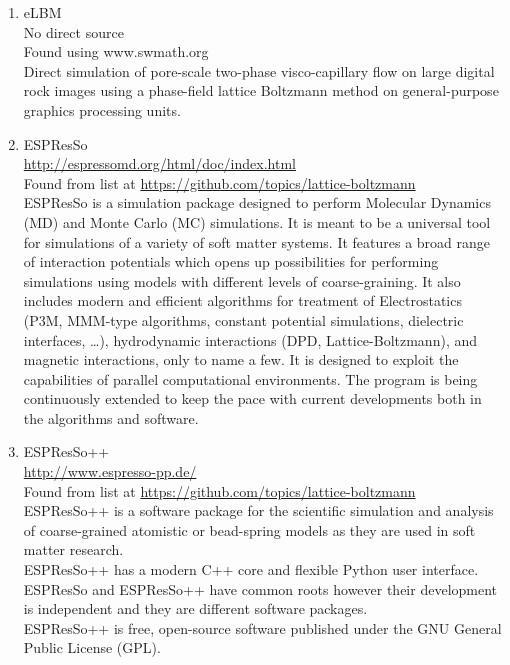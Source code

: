 \documentclass{article}
\begin{document}
\begin{enumerate}
	\item eLBM \\
	No direct source\\
	Found using www.swmath.org \\
	Direct simulation of pore-scale two-phase visco-capillary flow on large digital rock images using a phase-field lattice Boltzmann method on general-purpose graphics processing units. 
	
	\item ESPResSo
	\\
	\href{http://espressomd.org/html/doc/index.html}{http://espressomd.org/html/doc/index.html}
	\\
	Found from list at \href{https://github.com/topics/lattice-boltzmann}{https://github.com/topics/lattice-boltzmann}\\
	ESPResSo is a simulation package designed to perform Molecular Dynamics (MD) and Monte Carlo (MC) simulations. It is meant to be a universal tool for simulations of a variety of soft matter systems. It features a broad range of interaction potentials which opens up possibilities for performing simulations using models with different levels of coarse-graining. It also includes modern and efficient algorithms for treatment of Electrostatics (P3M, MMM-type algorithms, constant potential simulations, dielectric interfaces, …), hydrodynamic interactions (DPD, Lattice-Boltzmann), and magnetic interactions, only to name a few. It is designed to exploit the capabilities of parallel computational environments. The program is being continuously extended to keep the pace with current developments both in the algorithms and software.
	
	\item ESPResSo++
	\\
	\href{http://www.espresso-pp.de/}{http://www.espresso-pp.de/}
	\\
	Found from list at \href{https://github.com/topics/lattice-boltzmann}{https://github.com/topics/lattice-boltzmann}\\
	ESPResSo++ is a software package for the scientific simulation and analysis of coarse-grained atomistic or bead-spring models as they are used in soft matter research.\\
	ESPResSo++ has a modern C++ core and flexible Python user interface.\\
	ESPResSo and ESPResSo++ have common roots however their development is independent and they are different software packages.\\
	ESPResSo++ is free, open-source software published under the GNU General Public License (GPL).
	

\end{enumerate}
\end{document}
